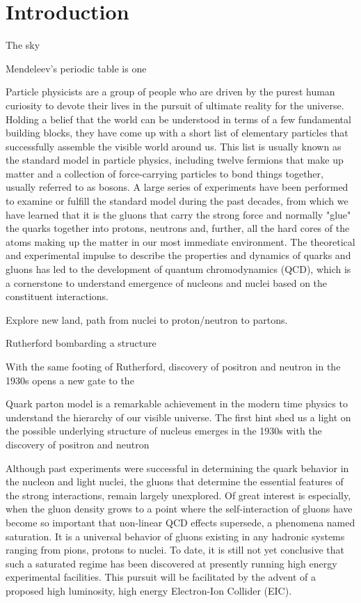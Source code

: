 \chapter{Introduction}
\label{chp:introduction}

The sky



Mendeleev's periodic table is one 

Particle physicists are a group of people who are driven by the purest human
curiosity to devote their lives in the pursuit of ultimate reality for the
universe. Holding a belief that the world can be understood in terms of a few
fundamental building blocks, they have come up with a short list
of elementary particles that successfully assemble the visible world around us.
This list is usually known as the standard model in particle physics, including
twelve fermions that make up matter and a collection of force-carrying particles
to bond things together, usually referred to as bosons. A large series of
experiments have been performed to examine or fulfill the standard model during
the past decades, from which we have learned that it is the gluons that carry
the strong force and normally "glue" the quarks together into protons, neutrons
and, further, all the hard cores of the atoms making up the matter in our most
immediate environment. The theoretical and experimental impulse to describe the
properties and dynamics of quarks and gluons has led to the development of
quantum chromodynamics (QCD), which is a cornerstone to understand emergence of
nucleons and nuclei based on the constituent interactions.

Explore new land, path from nuclei to proton/neutron to partons. 

Rutherford bombarding a structure 

With the same footing of Rutherford, discovery of positron and neutron in
the 1930s opens a new gate to the 


Quark parton model is a remarkable achievement in the modern time physics 
to understand the hierarchy of our visible universe. The first hint shed
us a light on the possible underlying structure of nucleus emerges in the
1930s with the discovery of positron and neutron

Although past experiments were successful in determining the quark behavior in
the nucleon and light nuclei, the gluons that determine the essential features
of the strong interactions, remain largely unexplored. Of great interest is
especially, when the gluon density grows to a point where the self-interaction
of gluons have become so important that non-linear QCD effects supersede, a
phenomena named saturation. It is a universal behavior of gluons existing in any
hadronic systems ranging from pions, protons to nuclei. To date, it is still not
yet conclusive that such a saturated regime has been discovered at presently
running high energy experimental facilities. This pursuit will be facilitated by
the advent of a proposed high luminosity, high energy Electron-Ion Collider (EIC).


